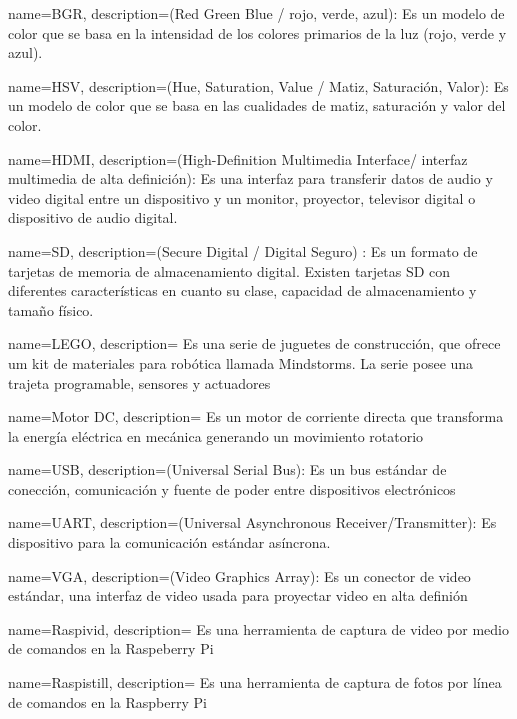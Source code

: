 {
  name=BGR,
  description={(Red Green Blue / rojo, verde, azul): Es un modelo de color que se basa en la intensidad de los colores primarios de la luz (rojo, verde y azul).}
}
  
{
  name=HSV,
  description={(Hue, Saturation, Value / Matiz, Saturación, Valor): Es un modelo de color que se basa en las cualidades de matiz, saturación y valor del color.}
}

{
  name=HDMI,
  description={(High-Definition Multimedia Interface/ interfaz multimedia de alta definición): Es una interfaz para transferir datos de audio y video digital entre un dispositivo y un monitor, proyector, televisor digital o dispositivo de audio digital.}
}

{
  name=SD,
  description={(Secure Digital / Digital Seguro) : Es un formato de tarjetas de memoria de almacenamiento digital. Existen tarjetas SD con diferentes características en cuanto su clase, capacidad de almacenamiento y tamaño físico.}
}  

{
  name=LEGO,
  description={ Es una serie de juguetes de construcci\'on, que ofrece um kit de materiales para rob\'otica llamada Mindstorms. La serie posee una trajeta programable, sensores y actuadores}
}  

{
  name=Motor DC,
  description={ Es un motor de corriente directa que transforma la energ\'ia el\'ectrica en mec\'anica generando un movimiento rotatorio}
}  

{
  name=USB,
  description={(Universal Serial Bus): Es un bus est\'andar de conecci\'on, comunicaci\'on y fuente de poder entre dispositivos electr\'onicos}
}  


{
  name=UART,
  description={(Universal Asynchronous Receiver/Transmitter): Es dispositivo para la comunicaci\'on est\'andar as\'incrona. }
}  

{
  name=VGA,
  description={(Video Graphics Array): Es un conector de video est\'andar, una interfaz de video usada para proyectar video en alta defini\'on }
}  

{
  name=Raspivid,
  description={ Es una herramienta de captura de video por medio de comandos en la Raspeberry Pi}
} 

{
  name=Raspistill,
  description={ Es una herramienta de captura de fotos por l\'inea de comandos en la Raspberry Pi }
} 
